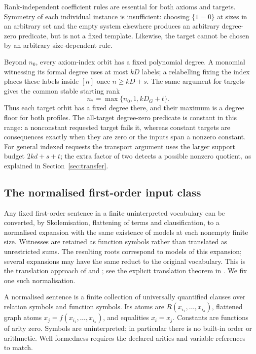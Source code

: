 \documentclass[11pt,a4paper]{article}
\theoremstyle{definition}\newtheorem{definition}[theorem]{Definition}
\theoremstyle{remark}\newtheorem{remark}[theorem]{Remark}
\begin{document}
Rank-independent coefficient rules are essential for both axioms and
targets. Symmetry of each individual instance is insufficient: choosing
$\{1=0\}$ at sizes in an arbitrary set and the empty system elsewhere
produces an arbitrary degree-zero predicate, but is not a fixed
template. Likewise, the target cannot be chosen by an arbitrary
size-dependent rule.

Beyond $n_0$, every axiom-index orbit has a fixed polynomial degree.
A monomial witnessing its formal degree uses at most $kD$ labels;
a relabelling fixing the index places these labels inside $[n]$ once
$n\ge kD+s$. The same argument for targets gives the common stable
starting rank
\begin{equation}\label{eq:stable-rank}
                        n_*=\max\{n_0,1,kD_G+t\}.
\end{equation}
Thus each target orbit has a fixed degree there, and their maximum is
a degree floor for both profiles. The all-target degree-zero predicate
is constant in this range: a nonconstant requested target fails it,
whereas constant targets are consequences exactly when they are zero
or the inputs span a nonzero constant. For general indexed requests the
transport argument uses the larger support budget $2kd+s+t$; the
extra factor of two detects a possible nonzero quotient, as explained
in Section~\ref{sec:transfer}.

\subsection{The normalised first-order input class}
Any fixed first-order sentence in a finite uninterpreted vocabulary can
be converted, by Skolemisation, flattening of terms and clausification,
to a normalised expansion with the same existence of models at each
nonempty finite size. Witnesses are retained as function symbols rather
than translated as unrestricted sums. The resulting roots correspond
to models of this expansion; several expansions may have the same
reduct to the original vocabulary. This is the translation approach of
\cite[Section~1.2]{Riis}\cite[Section~1.2]{RiisLong} and
\cite{RiisSitharamTautologies}; see the explicit translation theorem in
\cite[Section~II, Theorem~1]{RiisSitharamTranslationPreprint}.
We fix one such normalisation.

A normalised sentence is a finite collection of universally quantified clauses over relation symbols and function symbols. Its atoms are $R(x_{i_1},\ldots,x_{i_a})$, flattened graph atoms $x_j=f(x_{i_1},\ldots,x_{i_a})$, and equalities $x_i=x_j$. Constants are functions of arity zero. Symbols are uninterpreted; in particular there is no built-in order or arithmetic. Well-formedness requires the declared arities and variable references to match.
\end{document}

